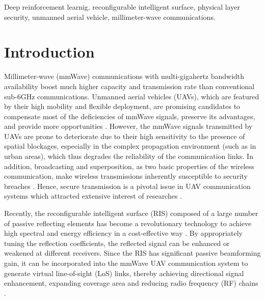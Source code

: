 \documentclass[12pt, draftclsnofoot, onecolumn]{IEEEtran}
\begin{document}
\begin{IEEEkeywords}
Deep reinforcement learnig, reconfigurable intelligent surface, physical layer security, unmanned aerial vehicle, millimeter-wave communications.
\end{IEEEkeywords}

%
\IEEEpeerreviewmaketitle



\section{Introduction}

Millimeter-wave (mmWave) communications with multi-gigahertz bandwidth availability boost much higher capacity and transmission rate than conventional sub-6GHz communications. Unmanned aerial vehicles (UAVs), which are featured by their high mobility and flexible deployment, are promising candidates to compensate most of the deficiencies of mmWave signals, preserve its advantages, and provide more opportunities \cite{UAVMMWAVE-2}. However, the mmWave signals transmitted by UAVs are prone to deteriorate due to their high sensitivity to the presence of spatial blockages, especially in the complex propagation environment (such as in urban areas), which thus degrades the reliability of the communication links. In addition, broadcasting and superposition, as two basic properties of the wireless communication, make wireless transmissions inherently susceptible to security breaches \cite{RIS-20}. Hence, secure transmission is a pivotal issue in UAV communication systems which attracted extensive interest of researches \cite{RISUAV-1,RISUAV-9}.

Recently, the reconfigurable intelligent surface (RIS) composed of a large number of passive reflecting elements has become a revolutionary technology to achieve high spectral and energy efficiency in a cost-effective way \cite{RIS-101}. By appropriately tuning the reflection coefficients, the reflected signal can be enhanced or weakened at different receivers. Since the RIS has significant passive beamforming gain, it can be incorporated into the mmWave UAV communication system to generate virtual line-of-sight (LoS) links, thereby achieving directional signal enhancement, expanding coverage area and reducing radio frequency (RF) chains \cite{RISUAV-7}.
\end{document}
